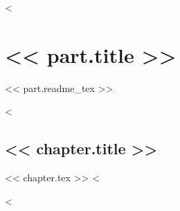 \documentclass[12pt]{book}
\begin{document}
<%
\part{ << part.title >> }
<< part.readme_tex >>

<%
\chapter{ << chapter.title >> }
<< chapter.tex >>
<%

<%
\end{document}
